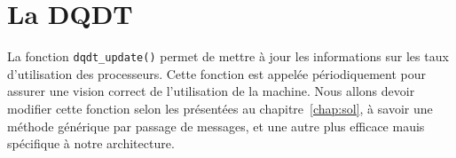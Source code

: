   \section{La DQDT}  

    La fonction \texttt{dqdt\_update()} permet de mettre à jour les informations
    sur les taux d'utilisation des processeurs. Cette fonction est appelée
    périodiquement pour assurer une vision correct de l'utilisation de la
    machine. Nous allons devoir modifier cette fonction selon les présentées au
    chapitre~\ref{chap:sol}, à savoir une méthode générique par passage de
    messages, et une autre plus efficace mauis spécifique à notre architecture.

